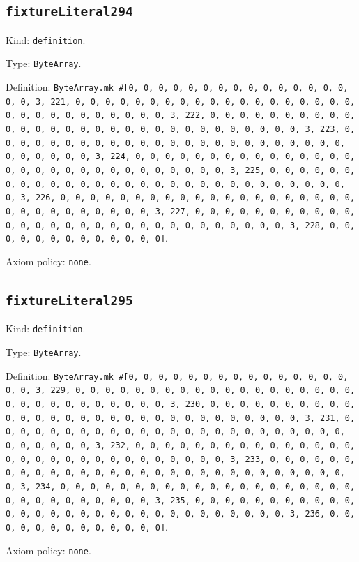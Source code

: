 \documentclass[11pt]{article}
\begin{document}
\subsection*{\texttt{fixtureLiteral294}}
\noindent Kind: \texttt{definition}.\par
\noindent Type: \texttt{ByteArray}.\par
\noindent Definition: \texttt{ByteArray.mk \#[0, 0, 0, 0, 0, 0, 0, 0, 0, 0, 0, 0, 0, 0, 0, 0, 0, 3, 221, 0, 0, 0, 0, 0, 0, 0, 0, 0, 0, 0, 0, 0, 0, 0, 0, 0, 0, 0, 0, 0, 0, 0, 0, 0, 0, 0, 0, 0, 0, 3, 222, 0, 0, 0, 0, 0, 0, 0, 0, 0, 0, 0, 0, 0, 0, 0, 0, 0, 0, 0, 0, 0, 0, 0, 0, 0, 0, 0, 0, 0, 0, 3, 223, 0, 0, 0, 0, 0, 0, 0, 0, 0, 0, 0, 0, 0, 0, 0, 0, 0, 0, 0, 0, 0, 0, 0, 0, 0, 0, 0, 0, 0, 0, 3, 224, 0, 0, 0, 0, 0, 0, 0, 0, 0, 0, 0, 0, 0, 0, 0, 0, 0, 0, 0, 0, 0, 0, 0, 0, 0, 0, 0, 0, 0, 0, 3, 225, 0, 0, 0, 0, 0, 0, 0, 0, 0, 0, 0, 0, 0, 0, 0, 0, 0, 0, 0, 0, 0, 0, 0, 0, 0, 0, 0, 0, 0, 0, 3, 226, 0, 0, 0, 0, 0, 0, 0, 0, 0, 0, 0, 0, 0, 0, 0, 0, 0, 0, 0, 0, 0, 0, 0, 0, 0, 0, 0, 0, 0, 0, 3, 227, 0, 0, 0, 0, 0, 0, 0, 0, 0, 0, 0, 0, 0, 0, 0, 0, 0, 0, 0, 0, 0, 0, 0, 0, 0, 0, 0, 0, 0, 0, 3, 228, 0, 0, 0, 0, 0, 0, 0, 0, 0, 0, 0, 0, 0]}.\par
\noindent Axiom policy: \texttt{none}.\par
\subsection*{\texttt{fixtureLiteral295}}
\noindent Kind: \texttt{definition}.\par
\noindent Type: \texttt{ByteArray}.\par
\noindent Definition: \texttt{ByteArray.mk \#[0, 0, 0, 0, 0, 0, 0, 0, 0, 0, 0, 0, 0, 0, 0, 0, 0, 3, 229, 0, 0, 0, 0, 0, 0, 0, 0, 0, 0, 0, 0, 0, 0, 0, 0, 0, 0, 0, 0, 0, 0, 0, 0, 0, 0, 0, 0, 0, 0, 3, 230, 0, 0, 0, 0, 0, 0, 0, 0, 0, 0, 0, 0, 0, 0, 0, 0, 0, 0, 0, 0, 0, 0, 0, 0, 0, 0, 0, 0, 0, 0, 3, 231, 0, 0, 0, 0, 0, 0, 0, 0, 0, 0, 0, 0, 0, 0, 0, 0, 0, 0, 0, 0, 0, 0, 0, 0, 0, 0, 0, 0, 0, 0, 3, 232, 0, 0, 0, 0, 0, 0, 0, 0, 0, 0, 0, 0, 0, 0, 0, 0, 0, 0, 0, 0, 0, 0, 0, 0, 0, 0, 0, 0, 0, 0, 3, 233, 0, 0, 0, 0, 0, 0, 0, 0, 0, 0, 0, 0, 0, 0, 0, 0, 0, 0, 0, 0, 0, 0, 0, 0, 0, 0, 0, 0, 0, 0, 3, 234, 0, 0, 0, 0, 0, 0, 0, 0, 0, 0, 0, 0, 0, 0, 0, 0, 0, 0, 0, 0, 0, 0, 0, 0, 0, 0, 0, 0, 0, 0, 3, 235, 0, 0, 0, 0, 0, 0, 0, 0, 0, 0, 0, 0, 0, 0, 0, 0, 0, 0, 0, 0, 0, 0, 0, 0, 0, 0, 0, 0, 0, 0, 3, 236, 0, 0, 0, 0, 0, 0, 0, 0, 0, 0, 0, 0, 0]}.\par
\noindent Axiom policy: \texttt{none}.\par
\end{document}
